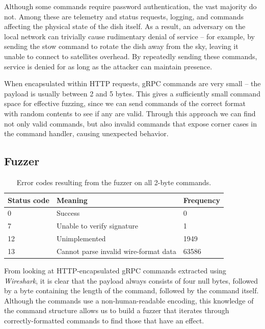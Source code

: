 Although some commands require password authentication, the vast majority do not.
Among these are telemetry and status requests, logging, and commands affecting the physical state of the dish itself.
As a result, an adversary on the local network can trivially cause rudimentary denial of service -- for example, by sending the stow command to rotate the dish away from the sky, leaving it unable to connect to satellites overhead.
By repeatedly sending these commands, service is denied for as long as the attacker can maintain presence.

When encapsulated within HTTP requests, gRPC commands are very small -- the payload is usually between 2 and 5 bytes.
This gives a sufficiently small command space for effective fuzzing, since we can send commands of the correct format with random contents to see if any are valid.
Through this approach we can find not only valid commands, but also invalid commands that expose corner cases in the command handler, causing unexpected behavior.


\subsection{Fuzzer}\label{sec:fuzzer}

\begin{table}
    \centering
    \begin{tabular}{lll}
        \toprule
        Status code & Meaning & Frequency \\
        \midrule
        0  & Success                               & 0     \\
        7  & Unable to verify signature            & 1     \\
        12 & Unimplemented                         & 1949  \\
        13 & Cannot parse invalid wire-format data & 63586 \\
        \bottomrule
    \end{tabular}
\caption{Error codes resulting from the fuzzer on all 2-byte commands.}
\label{tab:fuzzer-results}
\vspace{-1em}
\end{table}

From looking at HTTP-encapsulated gRPC commands extracted using \textit{Wireshark}, it is clear that the payload always consists of four null bytes, followed by a byte containing the length of the command, followed by the command itself.
Although the commands use a non-human-readable encoding, this knowledge of the command structure allows us to build a fuzzer that iterates through correctly-formatted commands to find those that have an effect.

